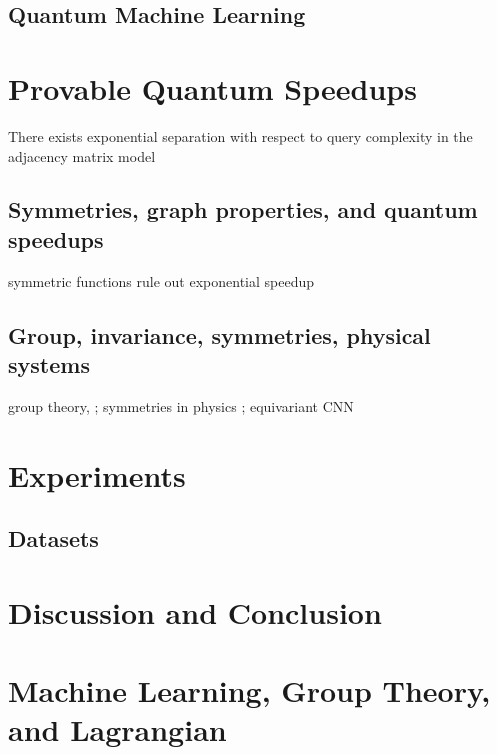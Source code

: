 \subsection{Quantum Machine Learning}

\section{Provable Quantum Speedups}\label{sec:speedup}
\begin{theorem}
	There exists exponential separation with respect to query complexity in the adjacency matrix model
\end{theorem}
\cite{zhengSpeedingLearningQuantum2022}

\subsection{Symmetries, graph properties, and quantum speedups}
symmetric functions rule out exponential speedup
\cite{ben-davidSymmetriesGraphProperties2020}

\subsection{Group, invariance, symmetries, physical systems}
\cite{glickCovariantQuantumKernels2021}
group theory, 
\cite{kondorGroupTheoreticalMethods2008};
symmetries in physics
\cite{bogatskiyLorentzGroupEquivariant2020};
equivariant CNN 
\cite{zhengSpeedingLearningQuantum2022}

\section{Experiments}\label{sec:experiments}

\subsection{Datasets}

\section{Discussion and Conclusion}\label{sec:discussion}

\printbibliography
\appendix

\section{Machine Learning, Group Theory, and Lagrangian}
